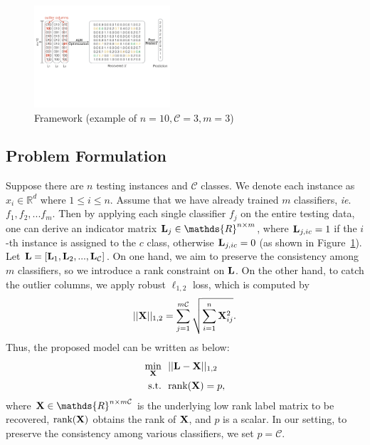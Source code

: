 \documentclass[letterpaper]{article}
\def\calC{{\mathcal{C}}}
\def\bL{{\bf L}}
\def\dsR{\mathds{R}}
\def\bX{{\bf X}}
\def\bX{{\bf X}}
\def\st{{\text{s.t.}}}
\def\ie{\emph{ie}}
\def\rank{{\text{rank}}}
\begin{document}
\begin{figure}[ht]
\centering\includegraphics[width=0.45\textwidth]{resource/frame_work.pdf}
\caption{Framework (example of $n=10, \calC=3, m=3$)}
\label{fig:framework}
\end{figure}




\subsection{Problem Formulation}

Suppose there are $n$ testing instances and $\calC$ classes.
We denote each instance as $x_i \in \dsR^{d}$ where $1 \leq i \leq n$.
Assume that we have already trained $m$ classifiers, \ie. $f_1, f_2, ... f_m$.
Then by applying each single classifier $f_j$ on the entire testing data, one can derive an indicator matrix $\bL_j \in \dsR^{n \times m}$, where $\bL_{j, ic} = 1$ if the $i$-th instance is assigned to the $c$ class, otherwise $\bL_{j, ic} = 0$ (as shown in Figure~\ref{fig:framework}).
Let $\bL = [ \bL_1, \bL_2, ..., \bL_\calC ]$.
On one hand, we aim to preserve the consistency among $m$ classifiers, so we introduce a rank constraint on $\bL$.
On the other hand, to catch the outlier columns, we apply robust $\ell_{1, 2}$ loss, which is computed by
{\small
$$ || \bX ||_{1,2} = \sum_{j = 1}^{m\calC} \sqrt{ \sum_{i = 1}^{n} \bX_{ij}^2 } . $$
}
\noindent
Thus, the proposed model can be written as below:
{\small
\begin{align}\label{eq:l12_rankconstraint}
  \min_{\bX} ~&~ || \bL - \bX ||_{1,2}    \nonumber \\
  \st ~&~ \rank(\bX) = p   ,
\end{align}
}
\noindent
where $\bX \in \dsR^{n \times m\calC}$ is the underlying low rank label matrix to be recovered, $\rank(\bX)$ obtains the rank of $\bX$,
and $p$ is a scalar.
In our setting, to preserve the consistency among various classifiers, we set $p = \calC$.
\end{document}
